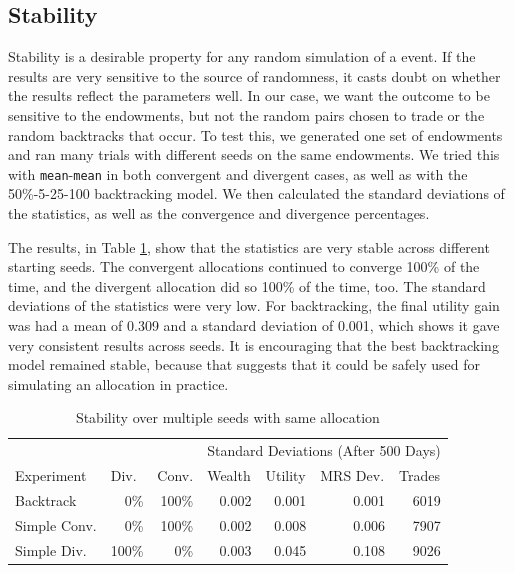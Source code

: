 \documentclass[12pt,a4paper,titlepage]{article}
\newcommand{\co}[1]{\texttt{#1}}
\begin{document}
\subsection{Stability}
Stability is a desirable property for any random simulation of a event.
If the results are very sensitive to the source of randomness, it casts doubt on whether the results reflect the parameters well.
In our case, we want the outcome to be sensitive to the endowments, but not the random pairs chosen to trade or the random backtracks that occur. 
To test this, we generated one set of endowments and ran many trials with different seeds on the same endowments.
We tried this with \co{mean}-\co{mean} in both convergent and divergent cases, as well as with the 50\%-5-25-100 backtracking model.
We then calculated the standard deviations of the statistics, as well as the convergence and divergence percentages.

The results, in Table \ref{tab:stable}, show that the statistics are very stable across different starting seeds.
The convergent allocations continued to converge 100\% of the time, and the divergent allocation did so 100\% of the time, too.
The standard deviations of the statistics were very low.
For backtracking, the final utility gain was had a mean of 0.309 and a standard deviation of 0.001, which shows it gave very consistent results across seeds.
It is encouraging that the best backtracking model remained stable, because that suggests that it could be safely used for simulating an allocation in practice.

\begin{table}[h]
  \begin{tabular}{l|rr|rrrr}
    & \multicolumn{1}{l}{} & \multicolumn{1}{l}{} & \multicolumn{ 4}{|c}{Standard Deviations (After 500 Days)} \\ 
    Experiment & \multicolumn{1}{l}{Div.} & \multicolumn{1}{l|}{Conv.} & \multicolumn{1}{l}{Wealth} & \multicolumn{1}{l}{Utility} & \multicolumn{1}{l}{MRS Dev.} & \multicolumn{1}{l}{Trades} \\ 
    \hline
    Backtrack & 0\% & 100\% & 0.002 & 0.001 & 0.001 & 6019 \\ 
    Simple Conv. & 0\% & 100\% & 0.002 & 0.008 & 0.006 & 7907 \\ 
    Simple Div. & 100\% & 0\% & 0.003 & 0.045 & 0.108 & 9026 \\ 
  \end{tabular}
  \caption{Stability over multiple seeds with same allocation}
  \label{tab:stable}
\end{table}
\end{document}
